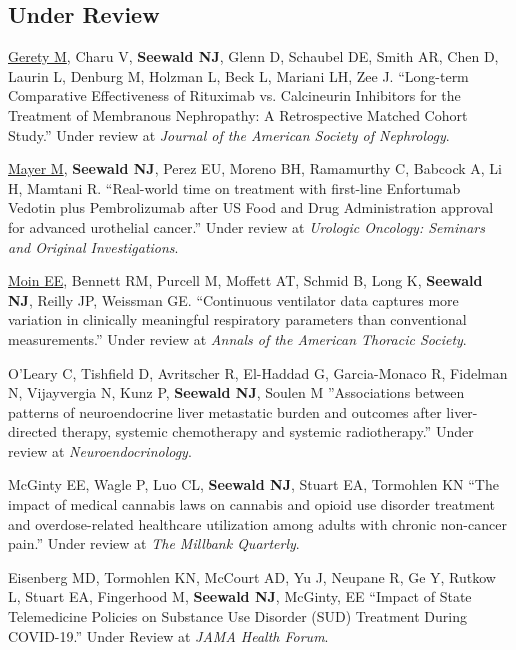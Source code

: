 \documentclass[letterpaper,11pt]{article} %
\begin{document}
    \subsection*{Under Review}
        \begin{etaremune}
            \item \underline{Gerety M}, Charu V, \textbf{Seewald NJ}, Glenn D, Schaubel DE, Smith AR, Chen D, Laurin L, Denburg M, Holzman L, Beck L, Mariani LH, Zee J. ``Long-term Comparative Effectiveness of Rituximab vs. Calcineurin Inhibitors for the Treatment of Membranous Nephropathy: A Retrospective Matched Cohort Study.'' Under review at \textit{Journal of the American Society of Nephrology}.
        
            \item \underline{Mayer M}, \textbf{Seewald NJ}, Perez EU, Moreno BH, Ramamurthy C, Babcock A, Li H, Mamtani R. ``Real-world time on treatment with first-line Enfortumab Vedotin plus Pembrolizumab after US Food and Drug Administration approval for advanced urothelial cancer.'' Under review at \textit{Urologic Oncology: Seminars and Original Investigations}.
        
            \item \underline{Moin EE}, Bennett RM, Purcell M, Moffett AT, Schmid B, Long K, \textbf{Seewald NJ}, Reilly JP, Weissman GE. ``Continuous ventilator data captures more variation in clinically meaningful respiratory parameters than conventional measurements.'' Under review at \textit{Annals of the American Thoracic Society}.
        
            \item O'Leary C, Tishfield D, Avritscher R, El-Haddad G, Garcia-Monaco R, Fidelman N, Vijayvergia N, Kunz P, \textbf{Seewald NJ}, Soulen M ''Associations between patterns of neuroendocrine liver metastatic burden and outcomes after liver-directed therapy, systemic chemotherapy and systemic radiotherapy.'' Under review at \textit{Neuroendocrinology}.
            
            \item McGinty EE, Wagle P, Luo CL, \textbf{Seewald NJ}, Stuart EA, Tormohlen KN ``The impact of medical cannabis laws on cannabis and opioid use disorder treatment and overdose-related healthcare utilization among adults with chronic non-cancer pain.'' Under review at \textit{The Millbank Quarterly}.
            
            \item Eisenberg MD, Tormohlen KN, McCourt AD, Yu J, Neupane R, Ge Y, Rutkow L, Stuart EA, Fingerhood M, \textbf{Seewald NJ}, McGinty, EE ``Impact of State Telemedicine Policies on Substance Use Disorder (SUD) Treatment During COVID-19.'' Under Review at \textit{JAMA Health Forum}.
            
	    \end{etaremune}
\end{document}

